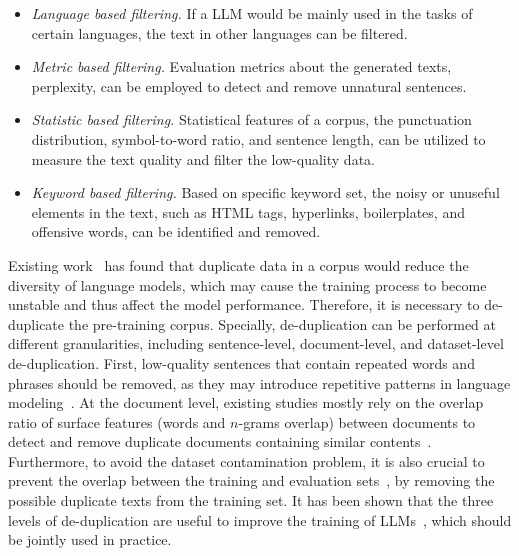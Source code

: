 \begin{itemize}[leftmargin=0.5cm, itemsep=5pt]
\item \emph{Language based filtering.} If a LLM would  be mainly used  in the tasks of certain languages, the text in other languages can be filtered.

\item \emph{Metric based filtering.} Evaluation metrics about the generated texts, \eg perplexity, can be employed to detect and remove unnatural sentences.

\item \emph{Statistic based  filtering.} Statistical features of a corpus, \eg the punctuation distribution, symbol-to-word ratio, and sentence length, can be utilized to measure the text quality and filter the low-quality data.

\item \emph{Keyword based filtering.} Based on specific keyword set, the noisy or unuseful elements in the text, such as HTML tags, hyperlinks, boilerplates, and offensive words, can be identified and removed. 
\end{itemize}

Existing work~\cite{Hernandez-arxiv-2022-Scaling} has found that duplicate data in a corpus would reduce the diversity of language models, which may  cause the training process to become unstable and thus affect the model performance.
Therefore, it is necessary to de-duplicate the pre-training corpus. 
Specially, de-duplication can be performed at different granularities, including sentence-level, document-level, and dataset-level de-duplication. 
First,  low-quality sentences that contain repeated words and phrases should be removed,  as they may introduce repetitive patterns in language modeling~\cite{Holtzman-2019-ICLR-The}. At the document level, existing studies mostly rely on the overlap ratio of surface features (\eg words and $n$-grams overlap) between documents to detect and remove duplicate documents containing similar contents~\cite{Rae-arxiv-2021-Scaling,Touvron-arxiv-2023-LLaMA,Scao-arxiv-2022-BLOOM,Lee-ACL-2022-Deduplicating}. 
Furthermore, to avoid the dataset contamination problem, it is also crucial to prevent the overlap between the training and evaluation sets~\cite{Chowdhery-arxiv-2022-PaLM}, by removing the possible duplicate texts  from the training set.
It has been shown that the three levels of de-duplication are useful to improve the training of LLMs~\cite{Carlini-arxiv-2022-Quantifying,Chowdhery-arxiv-2022-PaLM}, which should be jointly used in practice. 

